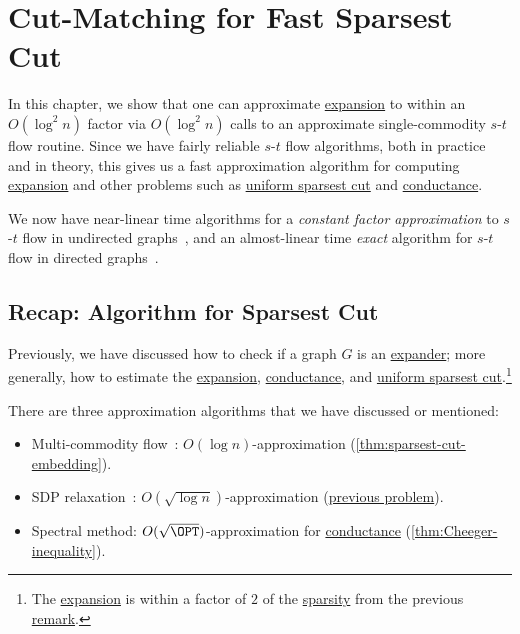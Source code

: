 \chapter{Cut-Matching for Fast Sparsest Cut}
In this chapter, we show that one can approximate \hyperref[def:expansion]{expansion} to within an \(O(\log ^2 n)\) factor via \(O(\log ^2 n)\) calls to an approximate single-commodity \(s\)-\(t\) flow routine. Since we have fairly reliable \(s\)-\(t\) flow algorithms, both in practice and in theory, this gives us a fast approximation algorithm for computing \hyperref[def:expansion]{expansion} and other problems such as \hyperref[prb:sparsest-cut]{uniform sparsest cut} and \hyperref[def:conductance]{conductance}.

\begin{note}
	We now have near-linear time algorithms for a \emph{constant factor approximation} to \(s\)-\(t\) flow in undirected graphs~\cite{peng2016approximate}, and an almost-linear time \emph{exact} algorithm for \(s\)-\(t\) flow in directed graphs~\cite{chen2022maximum}.
\end{note}

\section{Recap: Algorithm for Sparsest Cut}
Previously, we have discussed how to check if a graph \(G\) is an \hyperref[def:expander]{expander}; more generally, how to estimate the \hyperref[def:expansion]{expansion}, \hyperref[def:conductance]{conductance}, and \hyperref[prb:sparsest-cut]{uniform sparsest cut}.\footnote{The \hyperref[def:expansion]{expansion} is within a factor of \(2\) of the \hyperref[def:sparsity]{sparsity} from the previous \hyperref[rmk:expansion-sparsity]{remark}.}

\begin{prev}
	There are three approximation algorithms that we have discussed or mentioned:
	\begin{itemize}
		\item Multi-commodity flow~\cite{leighton1999multicommodity}: \(O(\log n)\)-approximation (\autoref{thm:sparsest-cut-embedding}).
		\item SDP relaxation~\cite{arora2009expander}: \(O(\sqrt{\log n} )\)-approximation (\hyperref[prb:SDP-sparsest-cut]{previous problem}).
		\item Spectral method: \(O(\sqrt{\OPT} )\)-approximation for \hyperref[def:conductance]{conductance} (\autoref{thm:Cheeger-inequality}).
	\end{itemize}
\end{prev}

